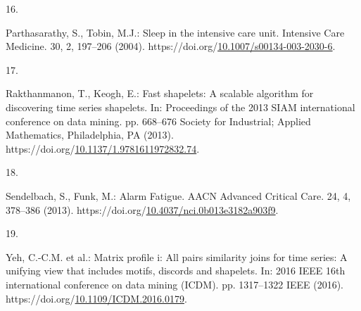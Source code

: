 \documentclass[runningheads]{llncs}
\newlength{\cslhangindent}
\newlength{\csllabelwidth}
\newenvironment{CSLReferences}[2] %
 {%
  \setlength{\parindent}{0pt}
  \ifodd #1 \everypar{\setlength{\hangindent}{\cslhangindent}}\ignorespaces\fi
  \ifnum #2 > 0
  \setlength{\parskip}{#2\baselineskip}
  \fi
 }%
 {}
\newcommand{\CSLLeftMargin}[1]{\parbox[t]{\csllabelwidth}{#1}}
\newcommand{\CSLRightInline}[1]{\parbox[t]{\linewidth - \csllabelwidth}{#1}\break}
\begin{document}
\begin{CSLReferences}{0}{0}
\leavevmode{}%
\CSLLeftMargin{16. }
\CSLRightInline{Parthasarathy, S., Tobin, M.J.: Sleep in the intensive care unit. Intensive Care Medicine. 30, 2, 197--206 (2004). https://doi.org/\href{https://doi.org/10.1007/s00134-003-2030-6}{10.1007/s00134-003-2030-6}.}

\leavevmode{}%
\CSLLeftMargin{17. }
\CSLRightInline{Rakthanmanon, T., Keogh, E.: Fast shapelets: A scalable algorithm for discovering time series shapelets. In: Proceedings of the 2013 SIAM international conference on data mining. pp. 668--676 Society for Industrial; Applied Mathematics, Philadelphia, PA (2013). https://doi.org/\href{https://doi.org/10.1137/1.9781611972832.74}{10.1137/1.9781611972832.74}.}

\leavevmode{}%
\CSLLeftMargin{18. }
\CSLRightInline{Sendelbach, S., Funk, M.: Alarm Fatigue. AACN Advanced Critical Care. 24, 4, 378--386 (2013). https://doi.org/\href{https://doi.org/10.4037/nci.0b013e3182a903f9}{10.4037/nci.0b013e3182a903f9}.}

\leavevmode{}%
\CSLLeftMargin{19. }
\CSLRightInline{Yeh, C.-C.M. et al.: Matrix profile i: All pairs similarity joins for time series: A unifying view that includes motifs, discords and shapelets. In: 2016 IEEE 16th international conference on data mining (ICDM). pp. 1317--1322 IEEE (2016). https://doi.org/\href{https://doi.org/10.1109/ICDM.2016.0179}{10.1109/ICDM.2016.0179}.}

\end{CSLReferences}
\end{document}
